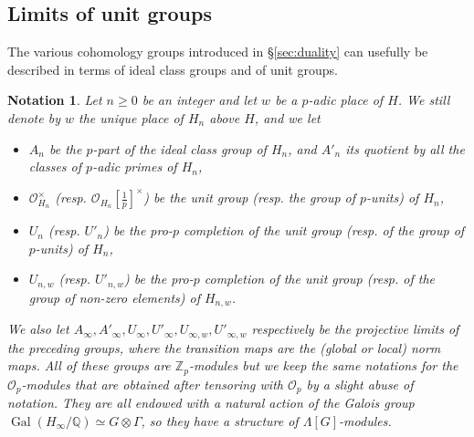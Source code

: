 \documentclass[12pt]{amsart}
\newcommand\bQ{\mathbb{Q}}
\newcommand\Zp{{\mathbb{Z}_p}}
\newcommand\cO{\mathcal{O}}
\newcommand\gX{\mathfrak{X}}
\newcommand{\loc}{\mathrm{loc}}
\DeclareMathOperator{\Gal}{Gal}
\theoremstyle{defstyle}
\newtheorem{notation}[subsubsection]{Notation}
\theoremstyle{thmstyle}
\begin{document}
\subsection{Limits of unit groups}\label{sec:limits_of_unit_groups}
The various cohomology groups introduced in \S\ref{sec:duality} can usefully be described in terms of ideal class groups and of unit groups.

\begin{notation}\label{nota:units_and_class_groups}
	Let $n\geq 0$ be an integer and let $w$ be a $p$-adic place of $H$. We still denote by $w$ the unique place of $H_n$ above $H$, and we let
	\begin{itemize}
		\item $A_{n}$ be the $p$-part of the ideal class group of ${H_n}$, and $A'_{n}$ its quotient by all the classes of $p$-adic primes of ${H_n}$,
		\item $\cO_{H_n}^\times$ (resp. $\cO_{H_n}[\tfrac{1}{p}]^\times$) be the unit group (resp. the group of $p$-units) of ${H_n}$,
		\item $U_{n}$ (resp. $U'_{n}$) be the pro-$p$ completion of the unit group (resp. of the group of $p$-units) of ${H_n}$,
		\item $U_{n,w}$ (resp. $U'_{n,w}$) be the pro-$p$ completion of the unit group (resp. of the group of non-zero elements) of ${H_{n,w}}$.
	\end{itemize}
		 We also let $A_\infty,A'_\infty,U_\infty,U'_\infty,U_{\infty,w},U'_{\infty,w}$ respectively be the projective limits of the preceding groups, where the transition maps are the (global or local) norm maps. All of these groups are $\Zp$-modules but we keep the same notations for the $\cO_p$-modules that are obtained after tensoring with $\cO_p$ by a slight abuse of notation. They are all endowed with a natural action of the Galois group $\Gal(H_\infty/\bQ)\simeq G \otimes \Gamma$, so they have a structure of $\Lambda[G]$-modules.
		 	\end{notation}
	 
\end{document}
